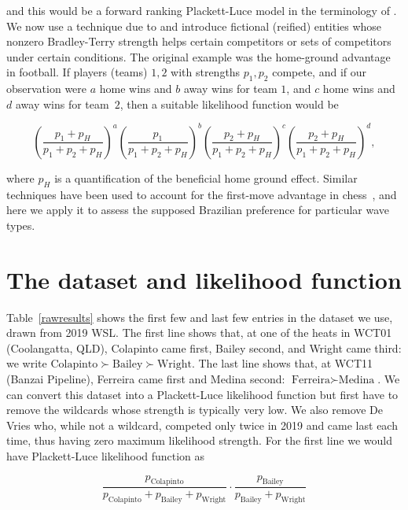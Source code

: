 \documentclass{article}
\begin{document}
and this would be a forward ranking Plackett-Luce model in the
terminology of \citet{johnson2020}.  We now use a technique due to
\citet{hankin2010,hankin2017_nomarkup} and introduce fictional (reified)
entities whose nonzero Bradley-Terry strength helps certain
competitors or sets of competitors under certain conditions.  The
original example was the home-ground advantage in football.  If
players (teams) $1,2$ with strengths $p_1,p_2$ compete, and if our
observation were $a$ home wins and $b$ away wins for team $1$, and $c$
home wins and $d$ away wins for team~$2$, then a suitable likelihood
function would be

\begin{equation}\label{home_ground_advantage}
\left(\frac{p_1+p_H}{p_1+p_2+p_H}\right)^a
\left(\frac{p_1}{p_1+p_2+p_H}\right)^b
\left(\frac{p_2+p_H}{p_1+p_2+p_H}\right)^c
\left(\frac{p_2+p_H}{p_1+p_2+p_H}\right)^d,
\end{equation}

\noindent where $p_H$ is a quantification of the beneficial home
ground effect.  Similar techniques have been used to account for the
first-move advantage in chess~\citep{hankin2020}, and here we apply it
to assess the supposed Brazilian preference for particular wave types.

\section{The dataset and likelihood function}

Table~\ref{rawresults} shows the first few and last few entries in the
dataset we use, drawn from 2019 WSL.  The first line shows that, at
one of the heats in WCT01 (Coolangatta, QLD), Colapinto came first,
Bailey second, and Wright came third: we write
$\mbox{Colapinto}\succ\mbox{Bailey}\succ\mbox{Wright}$.  The last line
shows that, at WCT11 (Banzai Pipeline), Ferreira came first and Medina
second: $\mbox{Ferreira}\succ\mbox{Medina}$.  We can convert this
dataset into a Plackett-Luce likelihood function but first have to
remove the wildcards whose strength is typically very low.  We also
remove De Vries who, while not a wildcard, competed only twice in 2019
and came last each time, thus having zero maximum likelihood strength.
For the first line we would have Plackett-Luce likelihood function as

\begin{equation}
\frac{p_\mathrm{Colapinto}}{p_\mathrm{Colapinto} + p_\mathrm{Bailey} + p_\mathrm{Wright}}\cdot
\frac{p_\mathrm{Bailey}}{p_\mathrm{Bailey} + p_\mathrm{Wright}}
\end{equation}
\end{document}
